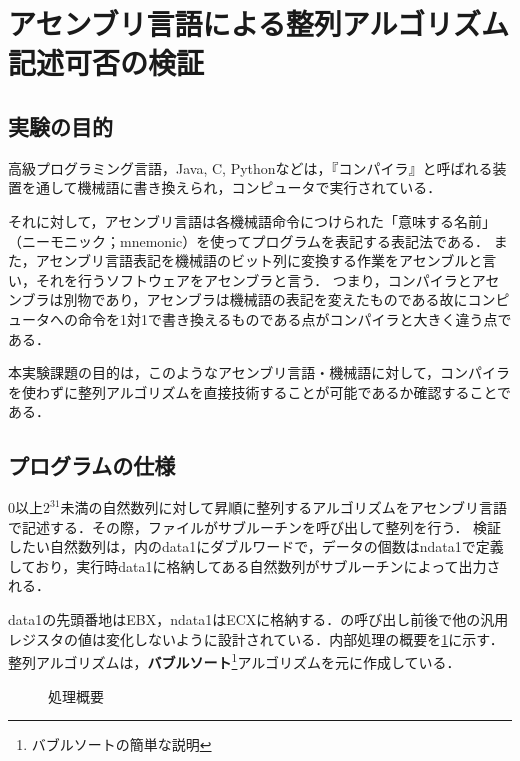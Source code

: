 \section{アセンブリ言語による整列アルゴリズム記述可否の検証}
\subsection{実験の目的}
高級プログラミング言語，{\ttfamily Java, C, Python}などは，『コンパイラ』と呼ばれる装置を通して機械語に書き換えられ，コンピュータで実行されている．\par
それに対して，アセンブリ言語は各機械語命令につけられた「意味する名前」（ニーモニック；mnemonic）を使ってプログラムを表記する表記法である．\cite{pl2text}
また，アセンブリ言語表記を機械語のビット列に変換する作業をアセンブルと言い，それを行うソフトウェアをアセンブラと言う．
つまり，コンパイラとアセンブラは別物であり，アセンブラは機械語の表記を変えたものである故にコンピュータへの命令を1対1で書き換えるものである点がコンパイラと大きく違う点である．\par
本実験課題の目的は，このようなアセンブリ言語・機械語に対して，コンパイラを使わずに整列アルゴリズムを直接技術することが可能であるか確認することである．
\subsection{プログラムの仕様}
\(0\)以上\(2^{31}\)未満の自然数列に対して昇順に整列するアルゴリズムをアセンブリ言語で記述する．その際，\testsort ファイルが\sort サブルーチンを呼び出して整列を行う．
検証したい自然数列は，\testsort 内の{\ttfamily data1}にダブルワードで，データの個数は{\ttfamily ndata1}で定義しており，\testsort 実行時{\ttfamily data1}に格納してある自然数列が\print サブルーチンによって出力される．\par
{\ttfamily data1}の先頭番地は{\ttfamily EBX}，{\ttfamily ndata1}は{\ttfamily ECX}に格納する．\sort の呼び出し前後で他の汎用レジスタの値は変化しないように設計されている．内部処理の概要を\ref{kadai1:abs}に示す．整列アルゴリズムは，\textbf{バブルソート}\footnote{バブルソートの簡単な説明}アルゴリズムを元に作成している．
\begin{figure}[h]
    \centering
    \caption{処理概要}
    \label{kadai1:abs}
\end{figure}
